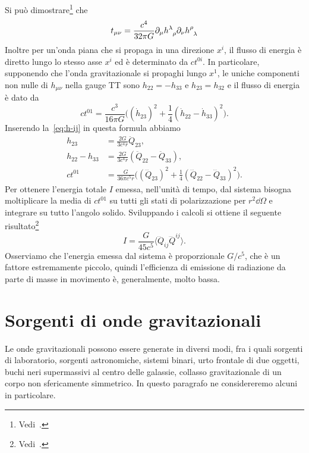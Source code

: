 Si può dimostrare\footnote{Vedi~\textcite[449]{landau:campi}.} che
\begin{equation}
  t_{\mu\nu} = \frac{c^{4}}{32\pi G} \partial_{\mu}
  \tensor{h}{^{\lambda}_{\rho}} \partial_{\nu} \tensor{h}{^{\rho}_{\lambda}}
\end{equation}
Inoltre per un'onda piana che si propaga in una direzione $x^{i}$, il flusso di
energia è diretto lungo lo stesso asse $x^{i}$ ed è determinato da $ct^{0i}$.
In particolare, supponendo che l'onda gravitazionale si propaghi lungo $x^{1}$,
le uniche componenti non nulle di $h_{\mu\nu}$ nella gauge TT sono
$h_{22} = -h_{33}$ e $h_{23} = h_{32}$ e il flusso di energia è dato da
\begin{equation}
  ct^{01} = \frac{c^{3}}{16\pi G}\bigg((\dot{h}_{23})^{2} +
  \frac{1}{4}(\dot{h}_{22} - \dot{h}_{33})^{2}\bigg).
\end{equation}
Inserendo la~\eqref{eq:h-ij} in questa formula abbiamo
\begin{subequations}
  \begin{align}
    h_{23} &= \frac{2G}{3c^{4}r} \ddot{Q}_{23}, \\
    h_{22} - h_{33} &= \frac{2G}{3c^{4}r}(\ddot{Q}_{22} - \ddot{Q}_{33}), \\
    ct^{01} &= \frac{G}{36\pi c^{5}r}\bigg((\dddot{Q}_{23})^{2} +
    \frac{1}{4}(\dddot{Q}_{22} - \dddot{Q}_{33})^{2}\bigg).
  \end{align}
\end{subequations}
Per ottenere l'energia totale $I$ emessa, nell'unità di tempo, dal sistema
bisogna moltiplicare la media di $ct^{01}$ su tutti gli stati di polarizzazione
per $r^{2}\dd\Omega$ e integrare su tutto l'angolo solido.  Sviluppando i
calcoli si ottiene il seguente
risultato\footnote{Vedi~\textcite[460-461]{landau:campi}.}
\begin{equation}
  I = \frac{G}{45c^{5}} \langle \dddot{Q}_{ij} \dddot{Q}^{ij}\rangle.
\end{equation}
Osserviamo che l'energia emessa dal sistema è proporzionale $G/c^{5}$, che è un
fattore estremamente piccolo, quindi l'efficienza di emissione di radiazione da
parte di masse in movimento è, generalmente, molto bassa.

\section{Sorgenti di onde gravitazionali}
\label{sec:sorgenti-onde-grav}

Le onde gravitazionali possono essere generate in diversi modi, fra i quali
sorgenti di laboratorio, sorgenti astronomiche, sistemi binari, urto frontale di
due oggetti, buchi neri supermassivi al centro delle galassie, collasso
gravitazionale di un corpo non sfericamente simmetrico.  In questo paragrafo ne
considereremo alcuni in particolare.

